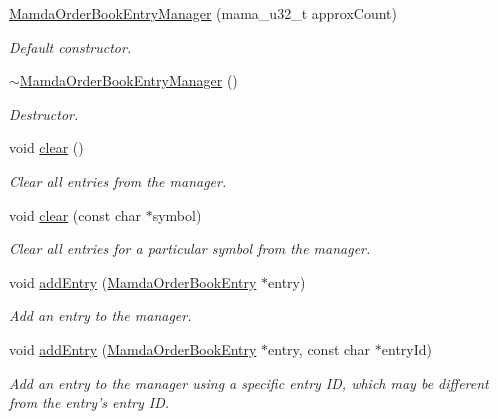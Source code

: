 \begin{CompactItemize}
\item 
\hyperlink{classWombat_1_1MamdaOrderBookEntryManager_5d742804d0e37c45f5b3ccd710726823}{Mamda\-Order\-Book\-Entry\-Manager} (mama\_\-u32\_\-t approx\-Count)
\begin{CompactList}\small\item\em Default constructor. \item\end{CompactList}\item 
\hyperlink{classWombat_1_1MamdaOrderBookEntryManager_7716971985e070a4542bdb0258a7a26f}{$\sim$Mamda\-Order\-Book\-Entry\-Manager} ()
\begin{CompactList}\small\item\em Destructor. \item\end{CompactList}\item 
void \hyperlink{classWombat_1_1MamdaOrderBookEntryManager_04f7889c0dc6c0526e2ba60822d80497}{clear} ()
\begin{CompactList}\small\item\em Clear all entries from the manager. \item\end{CompactList}\item 
void \hyperlink{classWombat_1_1MamdaOrderBookEntryManager_25e04f50ab6d5f5e24e5fd9d43f5ff27}{clear} (const char $\ast$symbol)
\begin{CompactList}\small\item\em Clear all entries for a particular symbol from the manager. \item\end{CompactList}\item 
void \hyperlink{classWombat_1_1MamdaOrderBookEntryManager_719fcdc67e4e6c34285ad7608138ca3d}{add\-Entry} (\hyperlink{classWombat_1_1MamdaOrderBookEntry}{Mamda\-Order\-Book\-Entry} $\ast$entry)
\begin{CompactList}\small\item\em Add an entry to the manager. \item\end{CompactList}\item 
void \hyperlink{classWombat_1_1MamdaOrderBookEntryManager_497e2518466b4b2c9919cdd9a6c0a742}{add\-Entry} (\hyperlink{classWombat_1_1MamdaOrderBookEntry}{Mamda\-Order\-Book\-Entry} $\ast$entry, const char $\ast$entry\-Id)
\begin{CompactList}\small\item\em Add an entry to the manager using a specific entry ID, which may be different from the entry's entry ID. \item\end{CompactList}\item 

\end{CompactItemize}
